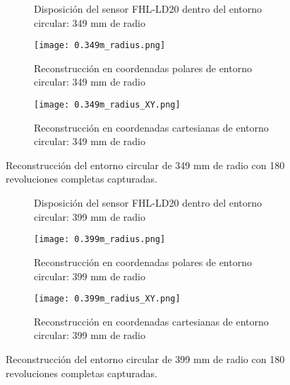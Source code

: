 \begin{figure}[H]
	\centering
	\begin{subfigure}{\textwidth}
		\centering
		\caption{Disposición del sensor FHL-LD20 dentro del entorno circular: 349 mm de radio}
		\label{fig:disposicion_lidar_var5}
		\vspace{1em}
	\end{subfigure}
	\begin{subfigure}{0.45\textwidth}
		\centering
		\texttt{[image: 0.349m\_radius.png]}
		\caption{Reconstrucción en coordenadas polares de entorno circular: 349 mm de radio}
		\label{fig:349m_radius_xy}
	\end{subfigure}
	\hspace{1em}
	\begin{subfigure}{0.45\textwidth}
		\centering
		\texttt{[image: 0.349m\_radius\_XY.png]}
		\caption{Reconstrucción en coordenadas cartesianas de entorno circular: 349 mm de radio}
		\label{fig:349m_radius}
	\end{subfigure}
	\caption{Reconstrucción del entorno circular de 349 mm de radio con 180 revoluciones completas capturadas.}
	\label{fig:disposicion_lidar_var_dist5}
\end{figure}

\begin{figure}[H]
	\centering
	\begin{subfigure}{\textwidth}
		\centering
		\caption{Disposición del sensor FHL-LD20 dentro del entorno circular: 399 mm de radio}
		\label{fig:disposicion_lidar_var6}
		\vspace{1em}
	\end{subfigure}
	\begin{subfigure}{0.45\textwidth}
		\centering
		\texttt{[image: 0.399m\_radius.png]}
		\caption{Reconstrucción en coordenadas polares de entorno circular: 399 mm de radio}
		\label{fig:399m_radius_xy}
	\end{subfigure}
	\hspace{1em}
	\begin{subfigure}{0.45\textwidth}
		\centering
		\texttt{[image: 0.399m\_radius\_XY.png]}
		\caption{Reconstrucción en coordenadas cartesianas de entorno circular: 399 mm de radio}
		\label{fig:399m_radius}
	\end{subfigure}
	\caption{Reconstrucción del entorno circular de 399 mm de radio con 180 revoluciones completas capturadas.}
	\label{fig:disposicion_lidar_var_dist6}
\end{figure}

